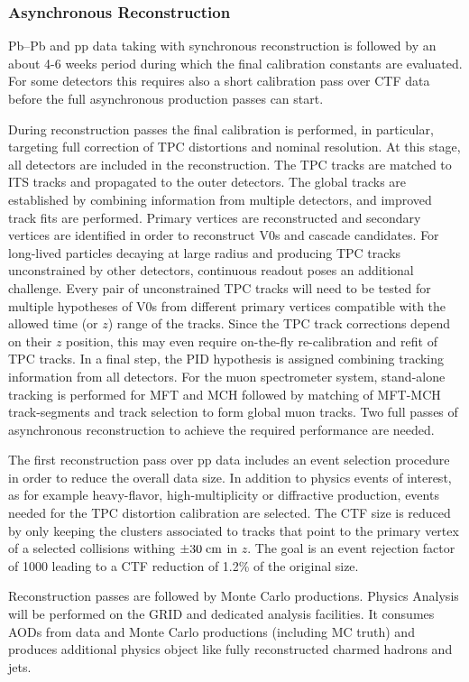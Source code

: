 \subsubsection{Asynchronous Reconstruction}
Pb--Pb and pp data taking with synchronous reconstruction is followed by an about 4-6 weeks period during which the final calibration constants are evaluated. For some detectors this requires also a short calibration pass over CTF data before the full asynchronous production passes can start.

During reconstruction passes the final calibration is performed, in particular, targeting full correction of TPC distortions and nominal resolution. At this stage, all detectors are included in the reconstruction. The TPC tracks are matched to ITS
tracks and propagated to the outer detectors. The global tracks are established
by combining information from
multiple detectors, and improved track fits are performed.
Primary vertices are reconstructed and secondary vertices are identified in order to
reconstruct V0s and cascade candidates. For long-lived particles decaying at large
radius and producing  TPC tracks unconstrained by other detectors, continuous readout poses an additional challenge. Every pair of unconstrained TPC tracks will need to be
tested for multiple hypotheses of V0s from different primary vertices compatible with
the allowed time (or $z$) range of the tracks. Since the TPC track corrections depend on their $z$ position, this may even require on-the-fly re-calibration and refit of
TPC tracks.  In a final step, the PID hypothesis is assigned combining tracking information from all detectors. For the muon spectrometer system, stand-alone tracking is performed for MFT and
MCH followed by matching of MFT-MCH track-segments and track selection to form global muon tracks. Two full passes of asynchronous reconstruction to achieve the required performance are needed.

The first reconstruction pass over pp data includes an event selection procedure in order to reduce the
overall data size. In addition to physics events of interest, as for example heavy-flavor,
high-multiplicity or diffractive production, events needed for the TPC distortion calibration are
selected. The CTF size is reduced by only keeping the clusters associated to tracks that point to the
primary vertex of a selected collisions withing $\pm 30 \; {\rm cm}$ in $z$. The goal is an event rejection factor of 1000 leading to a CTF reduction of 1.2\% of the original size.

Reconstruction passes are followed by Monte Carlo productions.
Physics Analysis will be performed on the GRID and dedicated analysis facilities. It consumes AODs from data and Monte Carlo productions (including MC truth)
and produces additional physics object like fully reconstructed charmed hadrons and jets.

